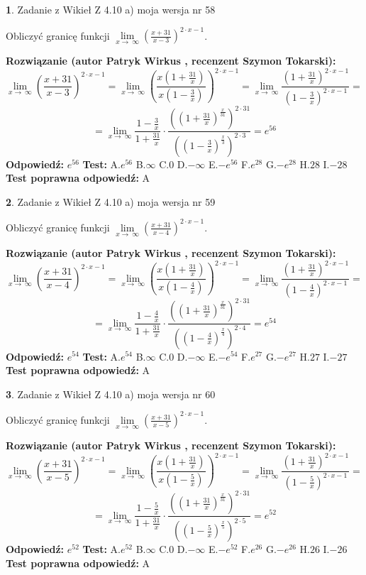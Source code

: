 \documentclass[12pt, a4paper]{article}
\theoremstyle{definition} %
\newtheorem{zad}{}
\newcommand{\zadStart}[1]{\begin{zad}#1\newline}
\newcommand{\zadStop}{\end{zad}}
\newcommand{\rozwStart}[2]{\noindent \textbf{Rozwiązanie (autor #1 , recenzent #2): }\newline}
\newcommand{\rozwStop}{\newline}
\newcommand{\odpStart}{\noindent \textbf{Odpowiedź:}\newline}
\newcommand{\odpStop}{\newline}
\newcommand{\testStart}{\noindent \textbf{Test:}\newline}
\newcommand{\testStop}{\newline}
\newcommand{\kluczStart}{\noindent \textbf{Test poprawna odpowiedź:}\newline}
\newcommand{\kluczStop}{\newline}
\begin{document}
\zadStart{Zadanie z Wikieł Z 4.10 a) moja wersja nr 58}

Obliczyć granicę funkcji  $\lim\limits_{x\to\ \infty}(\frac{x+31}{x-3})^{2\cdot x-1}$.
\zadStop
\rozwStart{Patryk Wirkus}{Szymon Tokarski}
$$\lim\limits_{x\to\ \infty}(\frac{x+31}{x-3})^{2\cdot x-1} = \lim\limits_{x\to\ \infty}(\frac{x(1+\frac{31}{x})}{x(1-\frac{3}{x})})^{2\cdot x-1}=\lim\limits_{x\to\ \infty}\frac{(1+\frac{31}{x})^{2\cdot x-1}}{(1-\frac{3}{x})^{2\cdot x-1}}=$$
$$=\lim\limits_{x\to\ \infty}\frac{1-\frac{3}{x}}{1+\frac{31}{x}}\cdot\frac{((1+\frac{31}{x})^{\frac{x}{31}})^{2\cdot31}}{((1-\frac{3}{x})^{\frac{x}{3}})^{2\cdot3}}=e^{56}$$
\rozwStop
\odpStart
$e^{56}$
\odpStop
\testStart
A.$e^{56}$ B.$\infty$ C.$0$ D.$-\infty$ E.$-e^{56}$
F.$e^{28}$ G.$-e^{28}$
H.$28$
I.$-28$
\testStop
\kluczStart
A
\kluczStop



\zadStart{Zadanie z Wikieł Z 4.10 a) moja wersja nr 59}

Obliczyć granicę funkcji  $\lim\limits_{x\to\ \infty}(\frac{x+31}{x-4})^{2\cdot x-1}$.
\zadStop
\rozwStart{Patryk Wirkus}{Szymon Tokarski}
$$\lim\limits_{x\to\ \infty}(\frac{x+31}{x-4})^{2\cdot x-1} = \lim\limits_{x\to\ \infty}(\frac{x(1+\frac{31}{x})}{x(1-\frac{4}{x})})^{2\cdot x-1}=\lim\limits_{x\to\ \infty}\frac{(1+\frac{31}{x})^{2\cdot x-1}}{(1-\frac{4}{x})^{2\cdot x-1}}=$$
$$=\lim\limits_{x\to\ \infty}\frac{1-\frac{4}{x}}{1+\frac{31}{x}}\cdot\frac{((1+\frac{31}{x})^{\frac{x}{31}})^{2\cdot31}}{((1-\frac{4}{x})^{\frac{x}{4}})^{2\cdot4}}=e^{54}$$
\rozwStop
\odpStart
$e^{54}$
\odpStop
\testStart
A.$e^{54}$ B.$\infty$ C.$0$ D.$-\infty$ E.$-e^{54}$
F.$e^{27}$ G.$-e^{27}$
H.$27$
I.$-27$
\testStop
\kluczStart
A
\kluczStop



\zadStart{Zadanie z Wikieł Z 4.10 a) moja wersja nr 60}

Obliczyć granicę funkcji  $\lim\limits_{x\to\ \infty}(\frac{x+31}{x-5})^{2\cdot x-1}$.
\zadStop
\rozwStart{Patryk Wirkus}{Szymon Tokarski}
$$\lim\limits_{x\to\ \infty}(\frac{x+31}{x-5})^{2\cdot x-1} = \lim\limits_{x\to\ \infty}(\frac{x(1+\frac{31}{x})}{x(1-\frac{5}{x})})^{2\cdot x-1}=\lim\limits_{x\to\ \infty}\frac{(1+\frac{31}{x})^{2\cdot x-1}}{(1-\frac{5}{x})^{2\cdot x-1}}=$$
$$=\lim\limits_{x\to\ \infty}\frac{1-\frac{5}{x}}{1+\frac{31}{x}}\cdot\frac{((1+\frac{31}{x})^{\frac{x}{31}})^{2\cdot31}}{((1-\frac{5}{x})^{\frac{x}{5}})^{2\cdot5}}=e^{52}$$
\rozwStop
\odpStart
$e^{52}$
\odpStop
\testStart
A.$e^{52}$ B.$\infty$ C.$0$ D.$-\infty$ E.$-e^{52}$
F.$e^{26}$ G.$-e^{26}$
H.$26$
I.$-26$
\testStop
\kluczStart
A
\kluczStop
\end{document}
